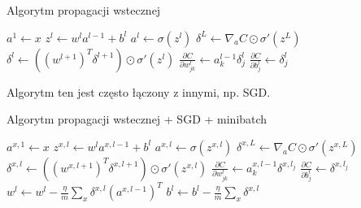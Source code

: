 \documentclass[10pt, oneside]{article}
\theoremstyle{remark}
\begin{document}
\begin{algorithm}
    \caption{Algorytm propagacji wstecznej}
    \label{alg:backprop}
    \begin{algorithmic}[1] %
            \State $a^1 \gets x$ 
            		\State $z^{l} \gets w^l a^{l-1}+b^l$
            		\State $a^{l} \gets \sigma(z^{l})$
            	\EndFor
            	\State $\delta^{L} \gets \nabla_a C \odot \sigma'(z^L)$
            		\State $\delta^{l} \gets ((w^{l+1})^T \delta^{l+1}) \odot \sigma'(z^{l})$         
            	\EndFor
            	\State $\frac{\partial C}{\partial w^l_{jk}} \gets a^{l-1}_k \delta^l_j$
            	\State $\frac{\partial C}{\partial b^l_j} \gets \delta^l_j$
        \EndFunction
    \end{algorithmic}
\end{algorithm}

Algorytm ten jest często łączony z innymi, np. SGD.

\begin{algorithm}
    \caption{Algorytm propagacji wstecznej + SGD + minibatch}
    \label{alg:backprop_sgf}
    \begin{algorithmic}[1] %
        		 
	            \State $a^{x,1} \gets x$ 
	            		\State $z^{x,l} \gets w^l a^{x,l-1}+b^l$
	            		\State $a^{x,l} \gets \sigma(z^{x,l})$
	            	\EndFor
	            	\State $\delta^{x,L} \gets \nabla_a C \odot \sigma'(z^{x,L})$
	            		\State $\delta^{x,l} \gets ((w^{x,l+1})^T \delta^{x,l+1}) \odot \sigma'(z^{x,l})$         
	            	\EndFor
	            	\State $\frac{\partial C}{\partial w^l_{jk}} \gets a^{x,l-1}_k \delta^{x,l_j}$
	            	\State $\frac{\partial C}{\partial b^l_j} \gets \delta^{x,l_j}$
	         \EndFor
	         	\State $w^l \gets w^l-\frac{\eta}{m} \sum_x \delta^{x,l} (a^{x,l-1})^T$
	         	\State $b^l \gets b^l-\frac{\eta}{m}
  \sum_x \delta^{x,l}$
	         \EndFor
        \EndFunction
    \end{algorithmic}
\end{algorithm}
\end{document}

